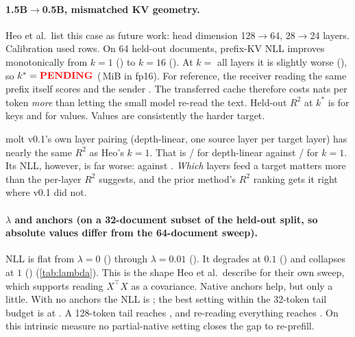 \paragraph{1.5B$\to$0.5B, mismatched KV geometry.}
Heo et al.\ list this case as future work: head dimension 128$\to$64, 28$\to$24 layers.
Calibration used  rows.
On 64 held-out documents, prefix-KV NLL improves monotonically from $k=1$ () to $k=16$ ().
At $k=$ all  layers it is slightly worse (), so $k^*=\res{fit.15b-05b.kstar}$ (\,MiB in fp16).
For reference, the receiver reading the same prefix itself scores  and the sender .
The transferred cache therefore costs  nats per token \emph{more} than letting the small model re-read the text.
Held-out $R^2$ at $k^*$ is  for keys and  for values.
Values are consistently the harder target.

molt v0.1's own layer pairing (depth-linear, one source layer per target layer) has nearly the same $R^2$ as Heo's $k=1$.
That is / for depth-linear against / for $k=1$.
Its NLL, however, is far worse:  against .
\emph{Which} layers feed a target matters more than the per-layer $R^2$ suggests, and the prior method's $R^2$ ranking gets it right where v0.1 did not.

\paragraph{$\lambda$ and anchors (on a 32-document subset of the held-out split, so absolute values differ from the 64-document sweep).}
NLL is flat from $\lambda=0$ () through $\lambda=0.01$ ().
It degrades at $0.1$ () and collapses at $1$ () (\cref{tab:lambda}).
This is the shape Heo et al.\ describe for their own sweep, which supports reading $X^\top X$ as a covariance.
Native anchors help, but only a little.
With no anchors the NLL is ; the best setting within the 32-token tail budget is  at .
A 128-token tail reaches , and re-reading everything reaches .
On this intrinsic measure no partial-native setting closes the gap to re-prefill.

